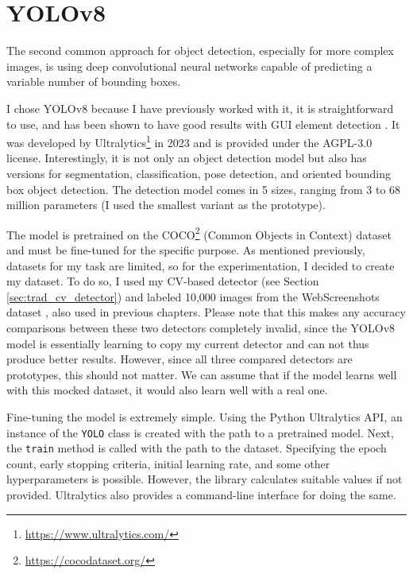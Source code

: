 \documentclass[
  digital,     %
  oneside,     %
  nosansbold,  %
  nocolorbold, %
  lof,         %
  lot,         %
]{fithesis4}
\begin{document}
\section{YOLOv8}

The second common approach for object detection, especially for more complex images, is using deep convolutional neural networks capable of predicting a variable number of bounding boxes.

I chose YOLOv8 \cite{yolov8_ultralytics} because I have previously worked with it, it is straightforward to use, and has been shown to have good results with GUI element detection \cite{GUI_YOLO_comparison}. It was developed by Ultralytics\footnote{\url{https://www.ultralytics.com/}} in 2023 and is provided under the AGPL-3.0 license. Interestingly, it is not only an object detection model but also has versions for segmentation, classification, pose detection, and oriented bounding box object detection. The detection model comes in 5 sizes, ranging from 3 to 68 million parameters \cite{ultralytics-docs} (I used the smallest variant as the prototype).

The model is pretrained on the COCO\footnote{\url{https://cocodataset.org/}} (Common Objects in Context) dataset and must be fine-tuned for the specific purpose. As mentioned previously, datasets for my task are limited, so for the experimentation, I decided to create my dataset. To do so, I used my CV-based detector (see Section \ref{sec:trad_cv_detector}) and labeled 10,000 images from the WebScreenshots dataset \cite{aydos2020}, also used in previous chapters. Please note that this makes any accuracy comparisons between these two detectors completely invalid, since the YOLOv8 model is essentially learning to copy my current detector and can not thus produce better results. However, since all three compared detectors are prototypes, this should not matter. We can assume that if the model learns well with this mocked dataset, it would also learn well with a real one.

Fine-tuning the model is extremely simple. Using the Python Ultralytics API, an instance of the \texttt{YOLO} class is created with the path to a pretrained model. Next, the \texttt{train} method is called with the path to the dataset. Specifying the epoch count, early stopping criteria, initial learning rate, and some other hyperparameters is possible. However, the library calculates suitable values if not provided. Ultralytics also provides a command-line interface for doing the same.
\end{document}
